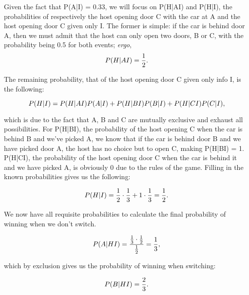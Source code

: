 Given the fact that P(A|I) = 0.33, we will focus on P(H|AI) and P(H|I), the
probabilities of respectively the host opening door C with the car at A and the
host opening door C given only I. The former is simple: if the car is behind
door A, then we must admit that the host can only open two doors, B or C, with
the probability being 0.5 for both events; \textit{ergo}, 
\begin{equation}
\\P(H|AI) = \frac{1}{2}.
\end{equation}

The remaining probability, that of the host opening door C given only info I, is the following:

\begin{equation}
\\P(H|I) = \\P(H|AI)\\P(A|I) + \\P(H|BI)\\P(B|I) + \\P(H|CI)\\P(C|I),
\end{equation}

which is due to the fact that A, B and C are mutually exclusive and exhaust all
possibilities. For P(H|BI), the probability of the host opening C when the car
is behind B and we've picked A, we know that if the car is behind door B and we
have picked door A, the host has no choice but to open C, making P(H|BI) = 1.
P(H|CI), the probability of the host opening door C when the car is behind it
and we have picked A, is obviously 0 due to the rules of the game.  Filling in
the known probabilities gives us the following:

\begin{equation}
  \\P(H|I) = \frac{1}{2} \cdot \frac{1}{3} + 1 \cdot \frac{1}{3} = \frac{1}{2}.
\end{equation}

We now have all requisite probabilities to calculate the final probability of winning when we don't switch.

\begin{equation}
  \\P(A|HI) = \frac{\frac{1}{3} \cdot \frac{1}{2}}{\frac{1}{2}} = \frac{1}{3},
\end{equation}

which by exclusion gives us the probability of winning when switching:

\begin{equation}
  \\P(B|HI) = \frac{2}{3}.
\end{equation}

